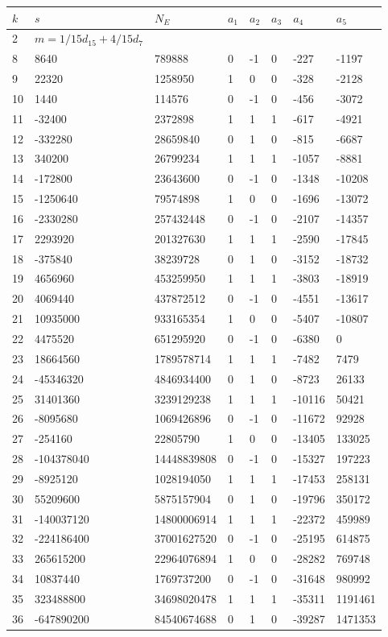 \documentclass{amsart}
\begin{document}
\begin{longtable}{|l|l|l|lllll|}
\hline
$k$ & $s$ & $N_E$ & $a_1$ & $a_2$ & $a_3$ & $a_4$ & $a_5$\\
\hline
2&$m=1/15d_{15}+4/15d_{7}$&&\multicolumn{5}{c|}{}\\
8&8640&789888&0&-1&0&-227&-1197\\
9&22320&1258950&1&0&0&-328&-2128\\
10&1440&114576&0&-1&0&-456&-3072\\
11&-32400&2372898&1&1&1&-617&-4921\\
12&-332280&28659840&0&1&0&-815&-6687\\
13&340200&26799234&1&1&1&-1057&-8881\\
14&-172800&23643600&0&-1&0&-1348&-10208\\
15&-1250640&79574898&1&0&0&-1696&-13072\\
16&-2330280&257432448&0&-1&0&-2107&-14357\\
17&2293920&201327630&1&1&1&-2590&-17845\\
18&-375840&38239728&0&1&0&-3152&-18732\\
19&4656960&453259950&1&1&1&-3803&-18919\\
20&4069440&437872512&0&-1&0&-4551&-13617\\
21&10935000&933165354&1&0&0&-5407&-10807\\
22&4475520&651295920&0&-1&0&-6380&0\\
23&18664560&1789578714&1&1&1&-7482&7479\\
24&-45346320&4846934400&0&1&0&-8723&26133\\
25&31401360&3239129238&1&1&1&-10116&50421\\
26&-8095680&1069426896&0&-1&0&-11672&92928\\
27&-254160&22805790&1&0&0&-13405&133025\\
28&-104378040&14448839808&0&-1&0&-15327&197223\\
29&-8925120&1028194050&1&1&1&-17453&258131\\
30&55209600&5875157904&0&1&0&-19796&350172\\
31&-140037120&14800006914&1&1&1&-22372&459989\\
32&-224186400&37001627520&0&-1&0&-25195&614875\\
33&265615200&22964076894&1&0&0&-28282&769748\\
34&10837440&1769737200&0&-1&0&-31648&980992\\
35&323488800&34698020478&1&1&1&-35311&1191461\\
36&-647890200&84540674688&0&1&0&-39287&1471353\\

\end{longtable}
\end{document}

